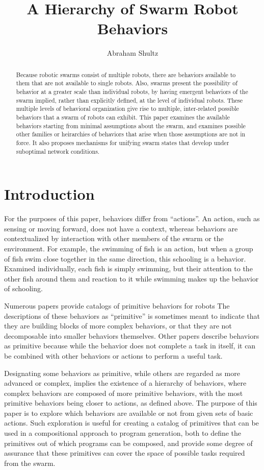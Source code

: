 \documentclass[]{article}
\title{A Hierarchy of Swarm Robot Behaviors}
\author{Abraham Shultz}
\begin{document}
\maketitle

\begin{abstract}
Because robotic swarms consist of multiple robots, there are behaviors available to them that are not available to single robots. Also, swarms present the possibility of behavior at a greater scale than individual robots, by having emergent behaviors of the swarm implied, rather than explicitly defined, at the level of individual robots. These multiple levels of behavioral organization give rise to multiple, inter-related possible behaviors that a swarm of robots can exhibit. This paper examines the available behaviors starting from minimal assumptions about the swarm, and examines possible other families or heirarchies of behaviors that arise when those assumptions are not in force. It also proposes mechanisms for unifying swarm states that develop under suboptimal network conditions. 

\end{abstract}

\section{Introduction}

For the purposes of this paper, behaviors differ from ``actions''. 
An action, such as sensing or moving forward, does not have a context, whereas behaviors are contextualized by interaction with other members of the swarm or the environment.
For example, the swimming of fish is an action, but when a group of fish swim close together in the same direction, this schooling is a behavior. 
Examined individually, each fish is simply swimming, but their attention to the other fish around them and reaction to it while swimming makes up the behavior of schooling. 

Numerous papers provide catalogs of primitive behaviors for robots 
The descriptions of these behaviors as ``primitive'' is sometimes meant to indicate that they are building blocks of more complex behaviors, or that they are not decomposable into smaller behaviors themselves. 
Other papers describe behaviors as primitive because while the behavior does not complete a task in itself, it can be combined with other behaviors or actions to perform a useful task. 

Designating some behaviors as primitive, while others are regarded as more advanced or complex, implies the existence of a hierarchy of behaviors, where complex behaviors are composed of more primitive behaviors, with the most primitive behaviors being closer to actions, as defined above. 
The purpose of this paper is to explore which behaviors are available or not from given sets of basic actions.
Such exploration is useful for creating a catalog of primitives that can be used in a compositional approach to program generation, both to define the primitives out of which programs can be composed, and provide some degree of assurance that these primitives can cover the space of possible tasks required from the swarm. 
\end{document}
